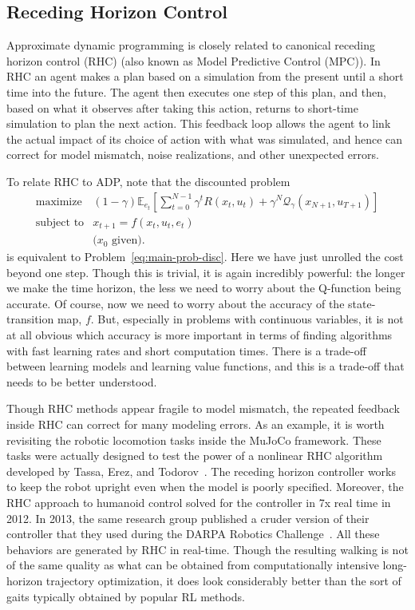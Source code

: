 \documentclass[11pt]{article}
\newcommand{\eq}[1]{\eqref{eq:#1}}
\numberwithin{equation}{section}
\newcommand{\E}{\mathbb{E}}
\begin{document}
\subsection{Receding Horizon Control}

Approximate dynamic programming is closely related to canonical receding horizon control (RHC) (also known as Model Predictive Control (MPC)). In RHC an agent makes a plan based on a simulation from the present until a short time into the future. The agent then executes one step of this plan, and then, based on what it observes after taking this action, returns to short-time simulation to plan the next action. This feedback loop allows the agent to link the actual impact of its choice of action with what was simulated, and hence can correct for model mismatch, noise realizations, and other unexpected errors.

To relate RHC to ADP, note that the discounted problem
\begin{equation*}\label{eq:main-prob-disc-rhc}	
	\begin{array}{ll}	
		\mbox{maximize} &  (1-\gamma) \E_{e_t}[ \sum_{t=0}^{N-1} \gamma^t R(x_t,u_t)  + \gamma^{N}  \mathcal{Q}_\gamma(x_{N+1},u_{T+1})]\\
		\mbox{subject to} &	x_{t+1} = f(x_t, u_t, e_t)\\
		& \mbox{($x_0$ given).}
	\end{array}
\end{equation*}
is equivalent to Problem~\eq{main-prob-disc}. Here we have just unrolled the cost beyond one step. Though this is trivial, it is again incredibly powerful: the longer we make the time horizon, the less we need to worry about the Q-function being accurate. Of course, now we need to worry about the accuracy of the state-transition map, $f$. But, especially in problems with continuous variables, it is not at all obvious  which accuracy is more important in terms of finding algorithms with fast learning rates and short computation times. There is a trade-off between learning models and learning value functions, and this is a trade-off that needs to be better understood.

Though RHC methods appear fragile to model mismatch, the repeated feedback inside RHC can correct for many modeling errors. As an example, it is worth revisiting the robotic locomotion tasks inside the MuJoCo framework. These tasks were actually designed to test the power of a nonlinear RHC algorithm developed by Tassa, Erez, and Todorov~\cite{tassa2012synthesis}. The receding horizon controller works to keep the robot upright even when the model is poorly specified. Moreover, the RHC approach to humanoid control solved for the controller in 7x real time in 2012. In 2013, the same research group published a cruder version of their controller that they used during the DARPA Robotics Challenge~\cite{erez2013integrated}. All these behaviors are generated by RHC in real-time. Though the resulting walking is not of the same quality as what can be obtained from computationally intensive long-horizon trajectory optimization, it does look considerably better than the sort of gaits typically obtained by popular RL methods.
 
\end{document}
